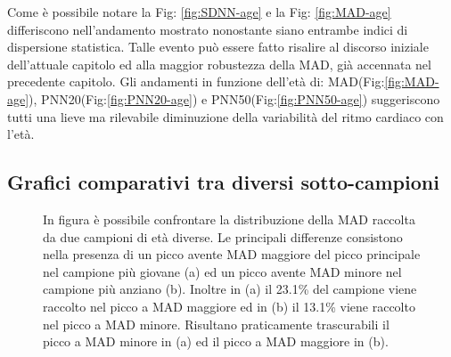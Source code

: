 \documentclass[12pt,a4paper, twoside, openright]{report}
\begin{document}
Come è possibile notare la Fig: \ref{fig:SDNN-age} e la Fig: \ref{fig:MAD-age} differiscono nell'andamento mostrato nonostante siano entrambe indici di dispersione statistica.
Talle evento può essere fatto risalire al discorso iniziale dell'attuale capitolo ed alla maggior robustezza della MAD, già accennata nel precedente capitolo.
Gli andamenti in funzione dell'età di: MAD(Fig:\ref{fig:MAD-age}), PNN20(Fig:\ref{fig:PNN20-age}) e PNN50(Fig:\ref{fig:PNN50-age}) suggeriscono tutti una lieve ma rilevabile diminuzione della variabilità del ritmo cardiaco con l'età.


\subsection{Grafici comparativi tra diversi sotto-campioni}

\begin{figure}[h!]
	\centering
	\hfill
	\caption{In figura è possibile confrontare la distribuzione della MAD raccolta da due campioni di età diverse.
	Le principali differenze consistono nella presenza di un picco avente MAD maggiore del picco principale nel campione più giovane (a) ed un picco avente MAD minore nel campione più anziano (b).
	Inoltre in (a) il 23.1\% del campione viene raccolto nel picco a MAD maggiore ed in (b) il 13.1\% viene raccolto nel picco a MAD minore.
	Risultano praticamente trascurabili il picco a MAD minore in (a) ed il picco a MAD maggiore in (b).}
	\label{fig:MAD}
\end{figure}
\end{document}
